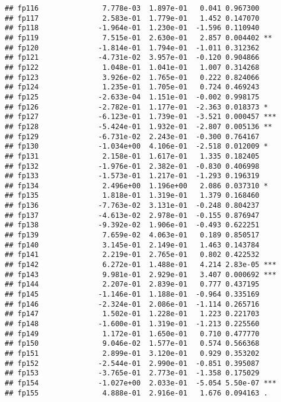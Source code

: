 \documentclass[
]{article}
\begin{document}
\begin{verbatim}
## fp116               7.778e-03  1.897e-01   0.041 0.967300    
## fp117               2.583e-01  1.779e-01   1.452 0.147070    
## fp118              -1.964e-01  1.230e-01  -1.596 0.110940    
## fp119               7.515e-01  2.630e-01   2.857 0.004402 ** 
## fp120              -1.814e-01  1.794e-01  -1.011 0.312362    
## fp121              -4.731e-02  3.957e-01  -0.120 0.904866    
## fp122               1.048e-01  1.041e-01   1.007 0.314268    
## fp123               3.926e-02  1.765e-01   0.222 0.824066    
## fp124               1.235e-01  1.705e-01   0.724 0.469243    
## fp125              -2.633e-04  1.151e-01  -0.002 0.998175    
## fp126              -2.782e-01  1.177e-01  -2.363 0.018373 *  
## fp127              -6.123e-01  1.739e-01  -3.521 0.000457 ***
## fp128              -5.424e-01  1.932e-01  -2.807 0.005136 ** 
## fp129              -6.731e-02  2.243e-01  -0.300 0.764167    
## fp130              -1.034e+00  4.106e-01  -2.518 0.012009 *  
## fp131               2.158e-01  1.617e-01   1.335 0.182405    
## fp132              -1.976e-01  2.382e-01  -0.830 0.406998    
## fp133              -1.573e-01  1.217e-01  -1.293 0.196319    
## fp134               2.496e+00  1.196e+00   2.086 0.037310 *  
## fp135               1.818e-01  1.319e-01   1.379 0.168460    
## fp136              -7.763e-02  3.131e-01  -0.248 0.804237    
## fp137              -4.613e-02  2.978e-01  -0.155 0.876947    
## fp138              -9.392e-02  1.906e-01  -0.493 0.622251    
## fp139               7.659e-02  4.063e-01   0.189 0.850517    
## fp140               3.145e-01  2.149e-01   1.463 0.143784    
## fp141               2.219e-01  2.765e-01   0.802 0.422532    
## fp142               6.272e-01  1.488e-01   4.214 2.83e-05 ***
## fp143               9.981e-01  2.929e-01   3.407 0.000692 ***
## fp144               2.207e-01  2.839e-01   0.777 0.437195    
## fp145              -1.146e-01  1.188e-01  -0.964 0.335169    
## fp146              -2.324e-01  2.086e-01  -1.114 0.265716    
## fp147               1.502e-01  1.228e-01   1.223 0.221703    
## fp148              -1.600e-01  1.319e-01  -1.213 0.225560    
## fp149               1.172e-01  1.650e-01   0.710 0.477770    
## fp150               9.046e-02  1.577e-01   0.574 0.566368    
## fp151               2.899e-01  3.120e-01   0.929 0.353202    
## fp152              -2.544e-01  2.990e-01  -0.851 0.395087    
## fp153              -3.765e-01  2.773e-01  -1.358 0.175029    
## fp154              -1.027e+00  2.033e-01  -5.054 5.50e-07 ***
## fp155               4.888e-01  2.916e-01   1.676 0.094163 .  

\end{verbatim}
\end{document}
